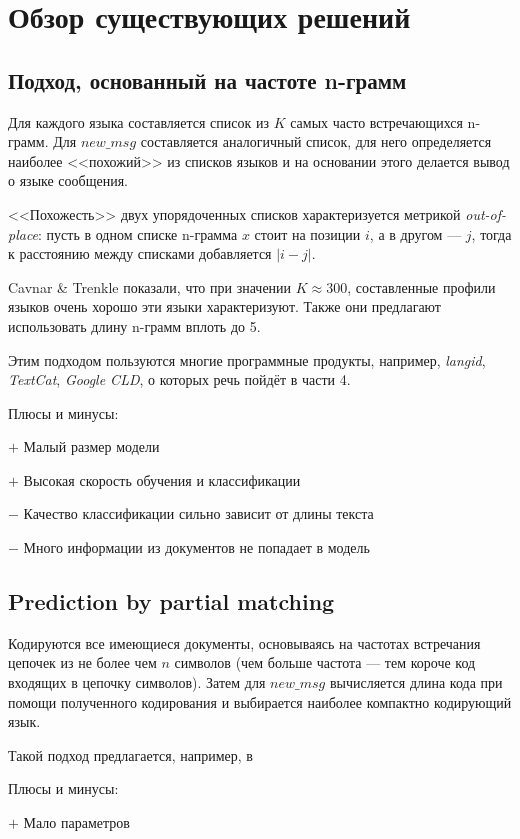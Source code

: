 \documentclass[a4paper, 14pt]{article}
\begin{document}
\section{Обзор существующих решений}
		\subsection{Подход, основанный на частоте n-грамм}
		Для каждого языка составляется список из $K$ самых часто встречающихся n-грамм. Для $new\_msg$ составляется аналогичный список, для него
		определяется наиболее <<похожий>> из списков языков
		и на основании этого делается вывод о языке сообщения. 
		
		<<Похожесть>> двух упорядоченных списков характеризуется метрикой \textit{out-of-place}: 
		пусть в одном списке n-грамма $x$ стоит на позиции $i$, а в другом \nolinebreak --- $j$, тогда к расстоянию между списками добавляется $|i - j|$.
		
		
		Cavnar \& Trenkle показали, что при значении $K \approx 300$, составленные 
		профили языков очень хорошо эти языки характеризуют. Также они предлагают использовать длину n-грамм вплоть до 5.
		
		Этим подходом пользуются многие программные продукты, например, \textit{langid}, \textit{TextCat}, \textit{Google CLD}, о которых речь пойдёт
		в части 4.
		
		\noindent Плюсы и минусы:
		
		
		$+$ Малый размер модели
		
		$+$ Высокая скорость обучения и классификации
		
		$-$ Качество классификации сильно зависит от длины текста
		
		$-$ Много информации из документов не попадает в модель
		
		\subsection{Prediction by partial matching}
		Кодируются все имеющиеся документы, основываясь на частотах встречания цепочек из не более чем $n$ символов (чем больше частота --- тем короче
		код входящих в цепочку символов). Затем для $new\_msg$ вычисляется длина кода при помощи полученного кодирования и выбирается наиболее
		компактно кодирующий язык.
		
		Такой подход предлагается, например, в \cite{ppm}
		
		\noindent Плюсы и минусы:
		
		$+$ 	Мало параметров
		
\end{document}
